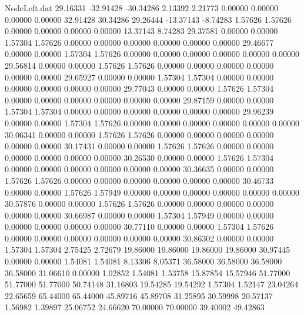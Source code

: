 \begin{filecontents}{NodeLeft.dat}
  29.16331  -32.91428  -30.34286     2.13392    2.21773    0.00000    0.00000    0.00000    0.00000   32.91428   30.34286
  29.26444  -13.37143   -8.74283     1.57626    1.57626    0.00000    0.00000    0.00000    0.00000   13.37143    8.74283
  29.37581    0.00000    0.00000     1.57304    1.57626    0.00000    0.00000    0.00000    0.00000    0.00000    0.00000
  29.46677    0.00000    0.00000     1.57304    1.57626    0.00000    0.00000    0.00000    0.00000    0.00000    0.00000
  29.56814    0.00000    0.00000     1.57626    1.57626    0.00000    0.00000    0.00000    0.00000    0.00000    0.00000
  29.65927    0.00000    0.00000     1.57304    1.57304    0.00000    0.00000    0.00000    0.00000    0.00000    0.00000
  29.77043    0.00000    0.00000     1.57626    1.57304    0.00000    0.00000    0.00000    0.00000    0.00000    0.00000
  29.87159    0.00000    0.00000     1.57304    1.57304    0.00000    0.00000    0.00000    0.00000    0.00000    0.00000
  29.96239    0.00000    0.00000     1.57304    1.57626    0.00000    0.00000    0.00000    0.00000    0.00000    0.00000
  30.06341    0.00000    0.00000     1.57626    1.57626    0.00000    0.00000    0.00000    0.00000    0.00000    0.00000
  30.17431    0.00000    0.00000     1.57626    1.57626    0.00000    0.00000    0.00000    0.00000    0.00000    0.00000
  30.26530    0.00000    0.00000     1.57626    1.57304    0.00000    0.00000    0.00000    0.00000    0.00000    0.00000
  30.36635    0.00000    0.00000     1.57626    1.57626    0.00000    0.00000    0.00000    0.00000    0.00000    0.00000
  30.46733    0.00000    0.00000     1.57626    1.57949    0.00000    0.00000    0.00000    0.00000    0.00000    0.00000
  30.57876    0.00000    0.00000     1.57626    1.57626    0.00000    0.00000    0.00000    0.00000    0.00000    0.00000
  30.66987    0.00000    0.00000     1.57304    1.57949    0.00000    0.00000    0.00000    0.00000    0.00000    0.00000
  30.77110    0.00000    0.00000     1.57304    1.57626    0.00000    0.00000    0.00000    0.00000    0.00000    0.00000
  30.86302    0.00000    0.00000     1.57304    1.57304    2.75425    2.72679   19.86000   19.86000   19.86000   19.86000
  30.97445    0.00000    0.00000     1.54081    1.54081    8.13306    8.05371   36.58000   36.58000   36.58000   36.58000
  31.06610    0.00000    1.02852     1.54081    1.53758   15.87854   15.57946   51.77000   51.77000   51.77000   50.74148
  31.16803   19.54285   19.54292     1.57304    1.52147   23.04264   22.65659   65.44000   65.44000   45.89716   45.89708
  31.25895   30.59998   20.57137     1.56982    1.39897   25.06752   24.66620   70.00000   70.00000   39.40002   49.42863

\end{filecontents}
